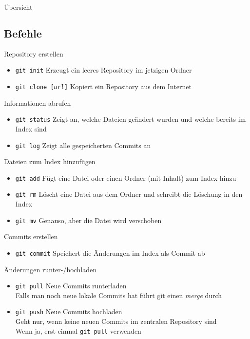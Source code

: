 \begin{frame}{Übersicht}
\end{frame}

\subsection{Befehle}
\begin{frame}{Repository erstellen}
  \begin{itemize}
    \item \texttt{git init}  Erzeugt ein leeres Repository im jetzigen Ordner
    \item \texttt{git clone [\textit{url}]} Kopiert ein Repository aus dem Internet
  \end{itemize}
\end{frame}

\begin{frame}{Informationen abrufen}
  \begin{itemize}
    \item \texttt{git status} Zeigt an, welche Dateien geändert wurden und welche bereits im Index sind
    \item \texttt{git log}    Zeigt alle gespeicherten Commits an
  \end{itemize}
\end{frame}

\begin{frame}{Dateien zum Index hinzufügen}
  \begin{itemize}
    \item \texttt{git add} Fügt eine Datei oder einen Ordner (mit Inhalt) zum Index hinzu
    \item \texttt{git rm}  Löscht eine Datei aus dem Ordner und schreibt die Löschung in den Index
    \item \texttt{git mv}  Genauso, aber die Datei wird verschoben
  \end{itemize}
\end{frame}

\begin{frame}{Commits erstellen}
  \begin{itemize}
    \item \texttt{git commit} Speichert die Änderungen im Index als Commit ab
  \end{itemize}
\end{frame}

\begin{frame}{Änderungen runter-/hochladen}
  \begin{itemize}
    \item \texttt{git pull} Neue Commits runterladen\\
                            Falls man noch neue lokale Commits hat führt git einen \textit{merge} durch
    \item \texttt{git push} Neue Commits hochladen\\
                            Geht nur, wenn keine neuen Commits im zentralen Repository sind\\
                            Wenn ja, erst einmal \texttt{git pull} verwenden
  \end{itemize}
\end{frame}

